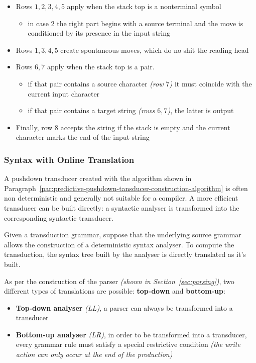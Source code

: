 \documentclass[english]{article}
\begin{document}
\begin{itemize}
  \item Rows \(1, 2, 3, 4, 5\) apply when the stack top is a nonterminal symbol
        \begin{itemize}[label=\(\rightarrow\)]
          \item in case \(2\) the right part begins with a source terminal and the move is conditioned by its presence in the input string
        \end{itemize}
  \item Rows \(1, 3, 4, 5\) create spontaneous moves, which do no shit the reading head
  \item Rows \(6, 7\) apply when the stack top is a pair.
        \begin{itemize}[label=\(\rightarrow\)]
          \item if that pair contains a source character \textit{(row \(7\))} it must coincide with the current input character
          \item if that pair contains a target string \textit{(rows \(6, 7\))}, the latter is output
        \end{itemize}
  \item Finally, row \(8\) accepts the string if the stack is empty and the current character marks the end of the input string
\end{itemize}

\subsubsection{Syntax  with Online Translation}

A pushdown transducer created with the algorithm shown in Paragraph~\ref{par:predictive-pushdown-tansducer-construction-algorithm} is often non deterministic and generally not suitable for a compiler.
A more efficient transducer can be built directly:
a syntactic analyser is transformed into the corresponding syntactic transducer.

Given a transduction grammar, suppose that the underlying source grammar allows the construction of a deterministic syntax analyser.
To compute the transduction, the syntax tree built by the analyser is directly translated as it's built.

As per the construction of the parser \textit{(shown in Section~\ref{sec:parsing})}, two different types of translations are possible:
\textbf{top-down} and \textbf{bottom-up}:

\begin{itemize}
  \item \textbf{Top-down analyser} \textit{(LL)}, a parser can always be transformed into a transducer
  \item \textbf{Bottom-up analyser} \textit{(LR)}, in order to be transformed into a transducer, every grammar rule must satisfy a special restrictive condition \textit{(the write action can only occur at the end of the production)}
\end{itemize}
\end{document}
